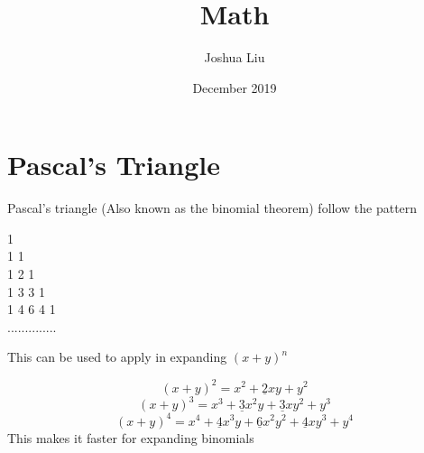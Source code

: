 \documentclass[12pt]{article}
\title{Math}
\author{Joshua Liu}
\date{December 2019}
\begin{document}
\maketitle
\newpage

\section{Pascal's Triangle}
Pascal's triangle (Also known as the binomial theorem) follow the pattern 
\begin{center}
1  \\
1 1 \\
1 2 1 \\
1 3 3 1 \\  
1 4 6 4 1\\
..............
\end{center}
This can be used to apply in expanding $(x+y)^n$

\[(x+y)^2=x^2+\underline{2}xy+y^2\]
\[(x+y)^3=x^3+\underline{3}x^2y+\underline{3}xy^2+y^3\]
\[(x+y)^4=x^4+\underline{4}x^3y+\underline{6}x^2y^2+\underline{4}xy^3+y^4\]
This makes it faster for expanding binomials
\end{document}
